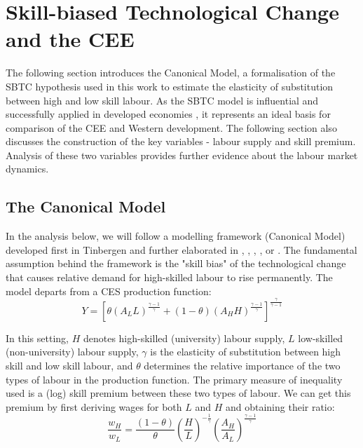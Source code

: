 \documentclass[11pt]{article}
\begin{document}
\newpage
\section{Skill-biased Technological Change and the CEE}\label{skill_bias_cee}
The following section introduces the Canonical Model, a formalisation of the SBTC hypothesis used in this work to estimate the elasticity of substitution between high and low skill labour. As the SBTC model is influential and successfully applied in developed economies \citep{acemoglu2012does, glitz2021skill}, it represents an ideal basis for comparison of the CEE and Western development. The following section also discusses the construction of the key variables - labour supply and skill premium. Analysis of these two variables provides further evidence about the labour market dynamics. 

\subsection{The Canonical Model}
In the analysis below, we will follow a modelling framework (Canonical Model) developed first in Tinbergen and further elaborated in \citet{katz1992changes}, \citet{goldin2010race}, \citet{card2001can}, \citet{acemoglu2011skills}, or \citet{glitz2021skill}.
The fundamental assumption behind the framework is the "skill bias" of the technological change that causes relative demand for high-skilled labour to rise permanently.
The model departs from a CES production function:
\begin{equation}
\label{eqn:STBC_prod_function}
Y = [\theta(A_{L}L)^{\frac{\gamma - 1}{\gamma}} + (1 - \theta)(A_{H}H)^{\frac{\gamma - 1}{\gamma}}]^\frac{\gamma}{\gamma - 1}
\end{equation}

In this setting, $H$ denotes high-skilled (university) labour supply, $L$ low-skilled (non-university) labour supply, $\gamma$ is the elasticity of substitution between high skill and low skill labour, and $\theta$ determines the relative importance of the two types of labour in the production function. The primary measure of inequality used is a (log) skill premium between these two types of labour. We can get this premium by first deriving wages for both $L$ and $H$ and obtaining their ratio:
\[\frac{w_{H}}{w_{L}} = \frac{(1 - \theta)}{\theta} \left(\frac{H}{L}\right)^{-\frac{1}{\gamma}}\left(\frac{A_{H}}{A_{L}}\right)^{\frac{\gamma - 1}{\gamma}}\]
\end{document}
